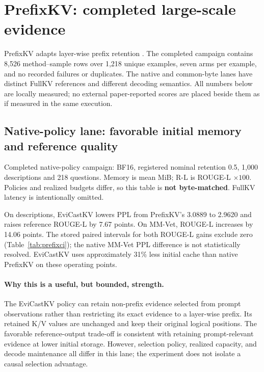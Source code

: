 \documentclass[10pt,letterpaper]{article}
\newcommand{\Evi}{EviCastKV}
\newcommand{\resulttable}[2]{\begin{center}\small\begin{adjustbox}{max width=#1}\end{adjustbox}\end{center}}
\begin{document}
\section{PrefixKV: completed large-scale evidence}
\label{sec:prefix}
PrefixKV adapts layer-wise prefix retention \citep{wang2025prefixkv}. The
completed campaign contains 8,526 method--sample rows over 1,218 unique
examples, seven arms per example, and no recorded failures or duplicates.
The native and common-byte lanes have distinct FullKV references and
different decoding semantics. All numbers below are locally measured;
no external paper-reported scores are placed beside them as if measured
in the same execution.

\subsection{Native-policy lane: favorable initial memory and reference quality}
\begin{table}[htbp]
\caption{Completed native-policy campaign: BF16, registered nominal
retention 0.5, 1,000 descriptions and 218 questions. Memory is mean MiB;
R-L is ROUGE-L $\times100$. Policies and realized budgets differ, so this
table is \textbf{not byte-matched}. FullKV latency is intentionally omitted.}
\label{tab:prefixnative}
\resulttable{\linewidth}{prefix_paper_native}
\end{table}

On descriptions, \Evi{} lowers PPL from PrefixKV's 3.0889 to 2.9620 and
raises reference ROUGE-L by 7.67 points. On MM-Vet, ROUGE-L increases by
14.06 points. The stored paired intervals for both ROUGE-L gains exclude
zero (Table~\ref{tab:prefixci}); the native MM-Vet PPL difference is not
statistically resolved. \Evi{} uses approximately 31\% less initial cache
than native PrefixKV on these operating points.

\paragraph{Why this is a useful, but bounded, strength.}
The \Evi{} policy can retain non-prefix evidence selected from prompt
observations rather than restricting its exact evidence to a layer-wise
prefix. Its retained K/V values are unchanged and keep their original
logical positions. The favorable reference-output trade-off is consistent
with retaining prompt-relevant evidence at lower initial storage. However,
selection policy, realized capacity, and decode maintenance all differ in
this lane; the experiment does not isolate a causal selection advantage.
\end{document}
